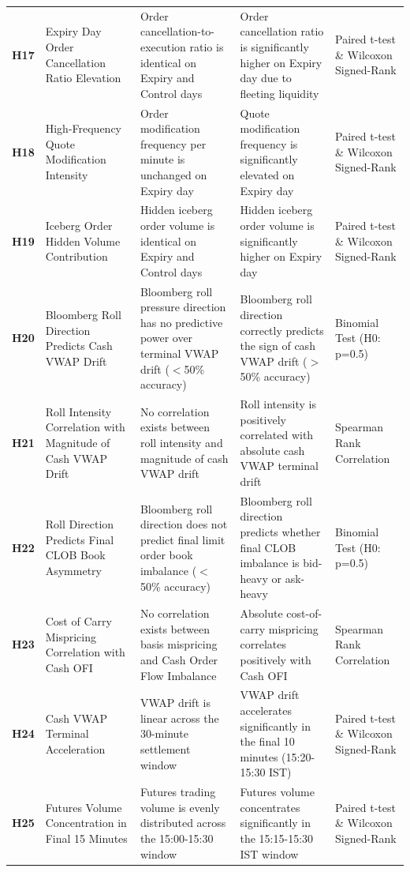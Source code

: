 \documentclass[11pt,a4paper]{article}
\begin{document}
\begin{longtable}{p{0.8cm} p{3.2cm} p{4.2cm} p{4.2cm} p{2.8cm}}
\addlinespace[3pt]
\textbf{H17} & Expiry Day Order Cancellation Ratio Elevation & Order cancellation-to-execution ratio is identical on Expiry and Control days & Order cancellation ratio is significantly higher on Expiry day due to fleeting liquidity & Paired t-test \& Wilcoxon Signed-Rank \\
\addlinespace[3pt]
\textbf{H18} & High-Frequency Quote Modification Intensity & Order modification frequency per minute is unchanged on Expiry day & Quote modification frequency is significantly elevated on Expiry day & Paired t-test \& Wilcoxon Signed-Rank \\
\addlinespace[3pt]
\textbf{H19} & Iceberg Order Hidden Volume Contribution & Hidden iceberg order volume is identical on Expiry and Control days & Hidden iceberg order volume is significantly higher on Expiry day & Paired t-test \& Wilcoxon Signed-Rank \\
\addlinespace[3pt]
\textbf{H20} & Bloomberg Roll Direction Predicts Cash VWAP Drift & Bloomberg roll pressure direction has no predictive power over terminal VWAP drift ($<$50\% accuracy) & Bloomberg roll direction correctly predicts the sign of cash VWAP drift ($>$50\% accuracy) & Binomial Test (H0: p=0.5) \\
\addlinespace[3pt]
\textbf{H21} & Roll Intensity Correlation with Magnitude of Cash VWAP Drift & No correlation exists between roll intensity and magnitude of cash VWAP drift & Roll intensity is positively correlated with absolute cash VWAP terminal drift & Spearman Rank Correlation \\
\addlinespace[3pt]
\textbf{H22} & Roll Direction Predicts Final CLOB Book Asymmetry & Bloomberg roll direction does not predict final limit order book imbalance ($<$50\% accuracy) & Bloomberg roll direction predicts whether final CLOB imbalance is bid-heavy or ask-heavy & Binomial Test (H0: p=0.5) \\
\addlinespace[3pt]
\textbf{H23} & Cost of Carry Mispricing Correlation with Cash OFI & No correlation exists between basis mispricing and Cash Order Flow Imbalance & Absolute cost-of-carry mispricing correlates positively with Cash OFI & Spearman Rank Correlation \\
\addlinespace[3pt]
\textbf{H24} & Cash VWAP Terminal Acceleration & VWAP drift is linear across the 30-minute settlement window & VWAP drift accelerates significantly in the final 10 minutes (15:20-15:30 IST) & Paired t-test \& Wilcoxon Signed-Rank \\
\addlinespace[3pt]
\textbf{H25} & Futures Volume Concentration in Final 15 Minutes & Futures trading volume is evenly distributed across the 15:00-15:30 window & Futures volume concentrates significantly in the 15:15-15:30 IST window & Paired t-test \& Wilcoxon Signed-Rank \\

\end{longtable}
\end{document}
